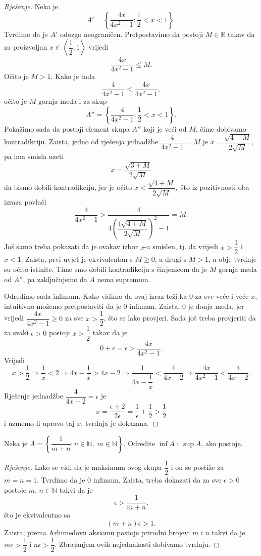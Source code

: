 \begin{proof}[Rješenje]
Neka je $$A'=\left\{\dfrac{4x}{4x^2-1} : \dfrac{1}{2}<x<1\right\}.$$ Tvrdimo da je $A'$ odozgo neograničen. Pretpostavimo da postoji $M\in \mathbb{R}$ takav da za proizvoljan $x\in \left\langle \dfrac{1}{2}, 1\right\rangle$ vrijedi $$\dfrac{4x}{4x^2-1}\leq M.$$ Očito je $M> 1$. Kako je tada $$\dfrac{4}{4x^2-1}<\dfrac{4x}{4x^2-1},$$ očito je $M$ gornja međa i za skup $$A''=\left\{\dfrac{4}{4x^2-1} : \dfrac{1}{2}<x<1\right\}.$$ Pokažimo sada da postoji element skupa $A''$ koji je veći od $M$, čime dobivamo kontradikciju. Zaista, jedno od rješenja jednadžbe $\dfrac{4}{4x^2-1}=M$ je $x=\dfrac{\sqrt{4+M}}{2\sqrt{M}},$ pa ima smisla uzeti $$x=\dfrac{\sqrt{3+M}}{2\sqrt{M}}$$ da bismo dobili kontradikciju, jer je očito $x<\dfrac{\sqrt{4+M}}{2\sqrt{M}},$ što iz pozitivnosti oba izraza povlači $$\dfrac{4}{4x^2-1}>\dfrac{4}{4\left(\dfrac{(\sqrt{4+M}}{2\sqrt{M}}\right)^2-1}=M.$$ Još samo treba pokazati da je ovakav izbor $x$-a smislen, tj. da vrijedi $x> \dfrac{1}{2}$ i $x<1$. Zaista, prvi uvjet je ekvivalentan s $M\geq 0$, a drugi s $M>1$, a obje tvrdnje su očito istinite. Time smo dobili kontradikciju s činjenicom da je $M$ gornja međa od $A''$, pa zaključujemo da $A$ nema supremum. 

Odredimo sada infimum. Kako vidimo da ovaj izraz teži ka $0$ za sve veće i veće $x$, intuitivno možemo pretpostaviti da je $0$ infimum. Zaista, $0$ je donja međa, jer vrijedi $\dfrac{4x}{4x^2-1}\geq 0$ za sve $x>\dfrac{1}{2}$, što se lako provjeri. Sada još treba provjeriti da za svaki $\epsilon>0$ postoji $x>\dfrac{1}{2}$ takav da je $$0+\epsilon=\epsilon>\dfrac{4x}{4x^2-1}.$$ Vrijedi
$$x>\dfrac{1}{2}\Rightarrow \dfrac{1}{x}<2\Rightarrow 4x-\dfrac{1}{x}>4x-2\Rightarrow \dfrac{1}{4x-\dfrac{1}{x}}<\dfrac{4}{4x-2}\Rightarrow \dfrac{4x}{4x^2-1}<\dfrac{4}{4x-2}.$$
Rješenje jednadžbe $\dfrac{4}{4x-2}=\epsilon$ je $$x=\dfrac{\epsilon+2}{2\epsilon}=\dfrac{1}{\epsilon}+\dfrac{1}{2}>\dfrac{1}{2}$$ i uzmemo li upravo taj $x$, tvrdnja je dokazana.
\end{proof}
\begin{exercise}
Neka je $A=\left\{\dfrac{1}{m+n} : n\in \mathbb{N},\; m\in \mathbb{N}\right\}$. Odredite $\inf{A}$ i $\sup{A}$, ako postoje.
\end{exercise}
\begin{proof}[Rješenje]
Lako se vidi da je maksimum ovog skupa $\dfrac{1}{2}$ i on se postiže za $m=n=1$. Tvrdimo da je $0$ infimum. Zaista, treba dokazati da za sve $\epsilon>0$ postoje $m$, $n\in \mathbb{N}$ takvi da je $$\epsilon>\dfrac{1}{m+n}.$$ što je ekvivalentno sa $$(m+n)\epsilon>1.$$ Zaista, prema Arhimedovu aksiomu postoje prirodni brojevi $m$ i $n$ takvi da je $m\epsilon>\dfrac{1}{2}$ i $n\epsilon>\dfrac{1}{2}$. Zbrajanjem ovih nejednakosti dobivamo tvrdnju.
\end{proof}
